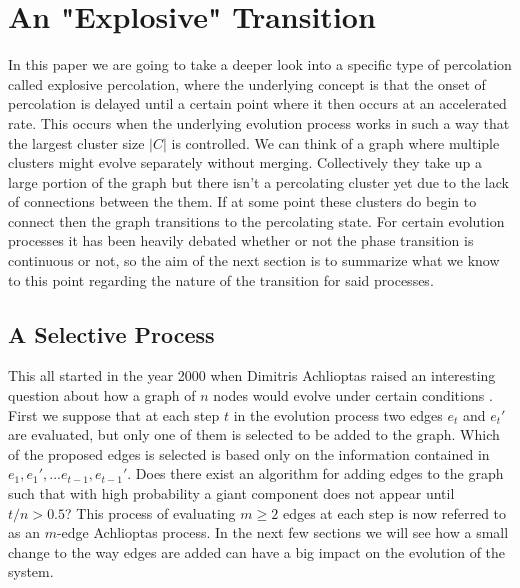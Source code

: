 \section{An "Explosive" Transition}
In this paper we are going to take a deeper look into a specific type of percolation called explosive percolation, where the underlying concept is that the onset of percolation is delayed until a certain point where it then occurs at an accelerated rate.
This occurs when the underlying evolution process works in such a way that the largest cluster size $|C|$ is controlled.
We can think of a graph where multiple clusters might evolve separately without merging.
Collectively they take up a large portion of the graph but there isn't a percolating cluster yet due to the lack of connections between the them.
If at some point these clusters do begin to connect then the graph transitions to the percolating state.
For certain evolution processes it has been heavily debated whether or not the phase transition is continuous or not, so the aim of the next section is to summarize what we know to this point regarding the nature of the transition for said processes.









\subsection{A Selective Process}
This all started in the year 2000 when Dimitris Achlioptas raised an interesting question about how a graph of $n$ nodes would evolve under certain conditions \cite{BF}.
First we suppose that at each step $t$ in the evolution process two edges $e_t$ and $e_t'$ are evaluated, but only one of them is selected to be added to the graph.
Which of the proposed edges is selected is based only on the information contained in $e_1, e_1', ... e_{t-1}, e_{t-1}'$.
Does there exist an algorithm for adding edges to the graph such that with high probability a giant component does not appear until $t/n > 0.5$?
This process of evaluating $m \ge 2$ edges at each step is now referred to as an $m$-edge Achlioptas process.
In the next few sections we will see how a small change to the way edges are added can have a big impact on the evolution of the system.










